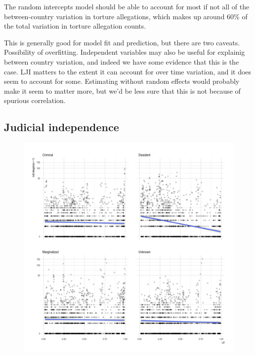 \documentclass[12pt]{article}
\begin{document}
The random intercepts model should be able to account for most if not all of the between-country variation in torture allegations, which makes up around 60\% of the total variation in torture allegation counts. 

This is generally good for model fit and prediction, but there are two caveats. Possibility of overfitting. Independent variables may also be useful for explainig between country variation, and indeed we have some evidence that this is the case. LJI matters to the extent it can account for over time variation, and it does seem to account for some. Estimating without random effects would probably make it seem to matter more, but we'd be less sure that this is not because of spurious correlation. 

\subsection*{Judicial independence}

\begin{figure}
\begin{center}
\caption{}
\includegraphics[width=.99\textwidth]{../output/scatterplot-itt-allegations-v-lji.png}
\end{center}
\end{figure}
\end{document}
